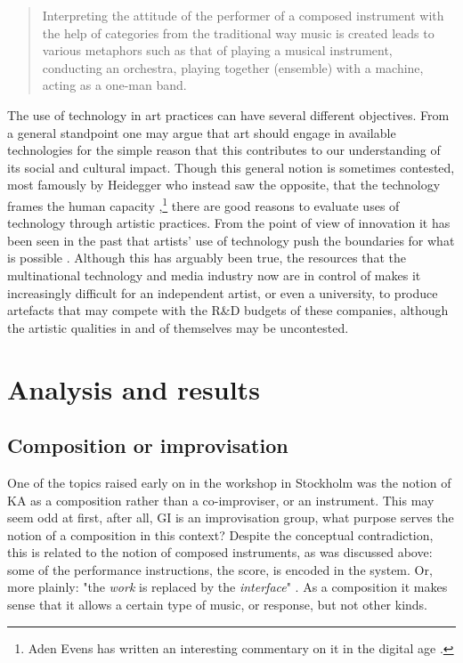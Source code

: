 \documentclass[11pt]{article}
\begin{document}
\begin{quote}
    Interpreting the attitude of the performer of a composed
    instrument with the help of categories from the traditional way
    music is created leads to various metaphors such as that of
    playing a musical instrument, conducting an orchestra, playing
    together (ensemble) with a machine, acting as a one-man
    band. \citep[140]{Schnell2002}
\end{quote}

The use of technology in art practices can have several different
objectives. From a general standpoint one may argue that art should
engage in available technologies for the simple reason that this
contributes to our understanding of its social and cultural
impact. Though this general notion is sometimes contested, most
famously by Heidegger who instead saw the opposite, that the
technology frames the human capacity
\citep{heidegger93},\footnote{Aden Evens has written an interesting
    commentary on it in the digital age \citep{evens05}.} there are
good reasons to evaluate uses of technology through artistic
practices. From the point of view of innovation it has been seen in
the past that artists' use of technology push the boundaries for what
is possible \citep[e.g. ][]{harris1999}. Although this has arguably
been true, the resources that the multinational technology and media
industry now are in control of makes it increasingly difficult for an
independent artist, or even a university, to produce artefacts that
may compete with the R\&D budgets of these companies, although the
artistic qualities in and of themselves may be uncontested.

\section*{Analysis and results}
\label{sec:org5fb345b}
\subsection*{Composition or improvisation}
\label{sec:orgc6d4b7f}
One of the topics raised early on in the workshop in Stockholm was the
notion of KA as a composition rather than a co-improviser, or an
instrument. This may seem odd at first, after all, GI is an
improvisation group, what purpose serves the notion of a composition
in this context? Despite the conceptual contradiction, this is related
to the notion of composed instruments, as was discussed above: some of
the performance instructions, the score, is encoded in the system. Or,
more plainly: "the \emph{work} is replaced by the \emph{interface}"
\citep[28]{frisk08phd}. As a composition it makes sense that it allows
a certain type of music, or response, but not other kinds.
\end{document}

